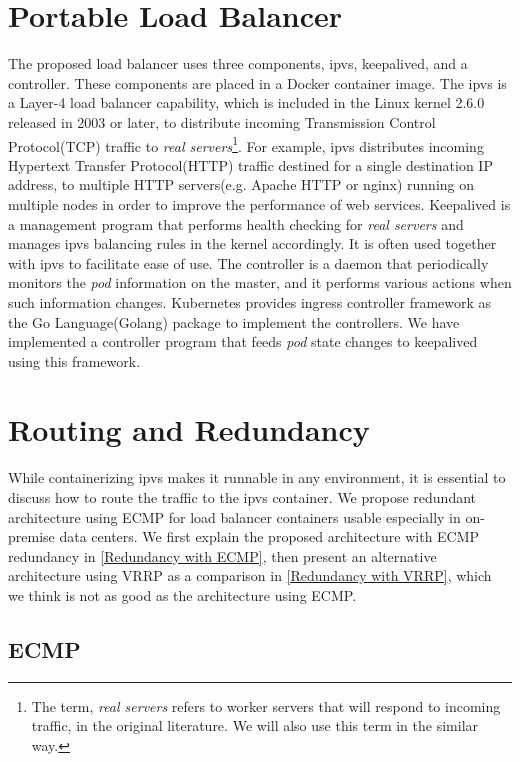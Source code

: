 \section{Portable Load Balancer}

The proposed load balancer uses three components, ipvs, keepalived, and a controller. 
These components are placed in a Docker container image.
The ipvs is a Layer-4 load balancer capability, which is included in the Linux kernel 2.6.0 released in 2003 or later, 
to distribute incoming Transmission Control Protocol(TCP) traffic to 
{\em real servers}\footnote{The term, {\em real servers} refers to worker servers that will respond to incoming traffic, 
in the original literature\cite{Zhang2000}. We will also use this term in the similar way.}\cite{Zhang2000}. 
For example, ipvs distributes incoming Hypertext Transfer Protocol(HTTP) traffic destined for a single destination IP address, 
to multiple HTTP servers(e.g. Apache HTTP or nginx) running on multiple nodes in order to improve the performance of web services.
Keepalived is a management program that performs health checking for {\em real servers}
and manages ipvs balancing rules in the kernel accordingly.
It is often used together with ipvs to facilitate ease of use.
The controller is a daemon that periodically monitors the {\em pod} information on the master, 
and it performs various actions when such information changes.
Kubernetes provides ingress controller framework as the Go Language(Golang) package to implement the controllers. 
We have implemented a controller program that feeds {\em pod} state changes to keepalived 
using this framework. 

\section{Routing and Redundancy}

While containerizing ipvs makes it runnable in any environment, it is essential to discuss how to route the traffic to the ipvs container.
We propose redundant architecture using ECMP for load balancer containers usable especially in on-premise data centers.
We first explain the proposed architecture with ECMP redundancy in \ref{Redundancy with ECMP}, then  present an alternative architecture using VRRP as a comparison in \ref{Redundancy with VRRP}, which we think is not as good as the architecture using ECMP.

\subsection{ECMP}\label{Subsec:Redundancy with ECMP}

